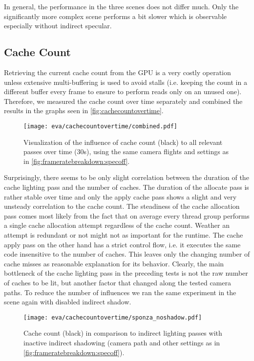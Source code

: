 \documentclass[thesis.tex]{subfiles}
\begin{document}
In general, the performance in the three scenes does not differ much.
Only the significantly more complex  scene performs a bit slower which is observable especially without indirect specular.

\subsection{Cache Count}
Retrieving the current cache count from the GPU is a very costly operation unless extensive multi-buffering is used to avoid stalls (i.e. keeping the count in a different buffer every frame to ensure to perform reads only on an unused one).
Therefore, we measured the cache count over time separately and combined the results in the graphs seen in \autoref{fig:cachecountovertime}.

\begin{figure}
\centering
\texttt{[image: eva/cachecountovertime/combined.pdf]}
\caption{Visualization of the influence of cache count (black) to all relevant passes over time (30s), using the same camera flights and settings as in \autoref{fig:frameratebreakdown:specoff}.}
\label{fig:cachecountovertime}
\end{figure}
Surprisingly, there seems to be only slight correlation between the duration of the cache lighting pass and the number of caches.
The duration of the allocate pass is rather stable over time and only the apply cache pass shows a slight and very unsteady correlation to the cache count.
The steadiness of the cache allocation pass comes most likely from the fact that on average every thread group performs a single cache allocation attempt regardless of the cache count.
Weather an attempt is redundant or not might not as important for the runtime.
The cache apply pass on the other hand has a strict control flow, i.e. it executes the same code insensitive to the number of caches.
This leaves only the changing number of cache misses as reasonable explanation for its behavior.
Clearly, the main bottleneck of the cache lighting pass in the preceding tests is not the raw number of caches to be lit, but another factor that changed along the tested camera paths.
To reduce the number of influences we ran the same experiment in the  scene again with disabled indirect shadow.
\\
\begin{figure}
\centering
\texttt{[image: eva/cachecountovertime/sponza\_noshadow.pdf]}
\caption{Cache count (black) in comparison to indirect lighting passes with inactive indirect shadowing (camera path and other settings as in \autoref{fig:frameratebreakdown:specoff}).}
\label{fig:cachecountovertime:noshadow}
\end{figure}
\end{document}
